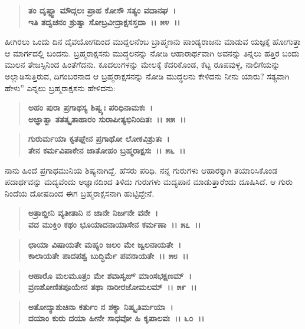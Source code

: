 \begin{verse}
\textbf{ತಂ ದೃಷ್ಟ್ವಾ ಮೌದ್ಗಲಃ ಪ್ರಾಹ ಕೋಸೌ ಸತ್ಯಂ ವದಾನಘ~।}\\\textbf{ಇತಿ ತದ್ವಚನಂ ಶ್ರುತ್ವಾ ಸೋಬ್ರವೀದ್ರಾಕ್ಷಸಸ್ತದಾ~।। ೫೪~।।}
\end{verse}

ಹೀಗಿರಲು ಒಂದು ದಿನ ದೈವಯೋಗದಿಂದ ಮುದ್ದಲನೆಂಬ ಬ್ರಾಹ್ಮಣನು ಪಾಂಡ್ಯರಾಜನು ಮಾಡುವ ಯಜ್ಞಕ್ಕೆ ಹೋಗುತ್ತಾ ಆ ಮಾರ್ಗದಲ್ಲಿ ಬಂದನು. ಬ್ರಹ್ಮರಾಕ್ಷಸನು ಮುದ್ಧಲನನ್ನು ನೋಡಿ ಆಹಾರಾರ್ಥವಾಗಿ ಅವನನ್ನು ತಿನ್ನಲು ಹತ್ತಿರ ಬಂದು ಮುಲನ ತೇಜಸ್ಸಿನಿಂದ ಹಿಂತೆಗೆದನು. ಕೂದಲುಗಳನ್ನು ಮೇಲಕ್ಕೆ ಕೆದರಿಕೊಂಡ, ಕೆಟ್ಟ ರೂಪವುಳ್ಳ, ನಾಲಿಗೆಯನ್ನು ಅಲ್ಲಾಡಿಸುತ್ತಿರುವ, ದಿಗಂಬರನಾದ ಆ ಬ್ರಹ್ಮರಾಕ್ಷಸನನ್ನು ನೋಡಿ ಮುದ್ಧಲನು ಕೇಳಿದನು ನೀನು ಯಾರು? ಸತ್ಯವಾಗಿ ಹೇಳು” ಎನ್ನಲು ಬ್ರಹ್ಮರಾಕ್ಷಸನು ಹೇಳಿದನು:

\begin{verse}
\textbf{ಅಹಂ ಪುರಾ ಪ್ರಗಾಥಸ್ಯ ಶಿಷ್ವ್ಯಃ ಪರಿಧಿನಾಮಕಃ~।}\\\textbf{ಅಜ್ಞಾತ್ವಾ ತತತ್ಕೃತಾಹಾರಂ ಸುರಾಪೀತ್ಯಭಿನಿಂದಿತಃ~।। ೫೫~।। }
\end{verse}

\begin{verse}
\textbf{ಗುರುರ್ಮಯಾ ಕೃತಘ್ನೇನ ಪ್ರಗಾಥೋ ಲೋಕವಿಶ್ರುತಃ~।}\\\textbf{ತೇನ ಕರ್ಮವಿಪಾಕೇನ ಜಾತೋಹಂ ಬ್ರಹ್ಮರಾಕ್ಷಸಃ~।। ೫೬~।।}
\end{verse}

ನಾನು ಹಿಂದೆ ಪ್ರಗಾಥಮುನಿಯ ಶಿಷ್ಯನಾಗಿದ್ದೆ. ಹೆಸರು ಪರಿಧಿ. ನನ್ನ ಗುರುಗಳು ಆಹಾರಕ್ಕಾಗಿ ತಯಾರಿಸಿಕೊಂಡ ಪದಾರ್ಥವನ್ನು ಮದ್ಯವೆಂದು ಅಜ್ಞಾನದಿಂದ ತಿಳಿದು ಗುರುಗಳು ಮದ್ಯಪಾನ ಮಾಡುತ್ತಾರೆಂದು ದೂಷಿಸಿದೆ. ಆ ಗುರು ನಿಂದೆಯ ದೋಷದಿಂದ ಈಗ ಬ್ರಹ್ಮರಾಕ್ಷಸನಾಗಿ ಹುಟ್ಟಿದ್ದೇನೆ.

\begin{verse}
\textbf{ಅತ್ರಾಬ್ದೀನಿ ವ್ಯತೀತಾನಿ ನ ಜಾನೇ ನಿರ್ಜನೇ ವನೇ~।}\\\textbf{ವದ ಮುಕ್ತಿಂ ಕಥಂ ಭೂಯಾದನಾಯಾಸೇನ ಕರ್ಮಣಾ~।। ೫೭~।।} 
\end{verse}

\begin{verse}
\textbf{ಛಾಯಾ ವಿಷಾಯತೇ ಮಹ್ಯಂ ಜಲಂ ಮೇ ಜ್ವಲನಾಯತೇ~।}\\\textbf{ಕಾಲಾಯತೇ ಪಾದಪಶ್ವ ಬುದ್ಧಿರ್ಮೆ ಪವನಾಯತೇ~।। ೫೮~।। }
\end{verse}

\begin{verse}
\textbf{ಆಹಾರೊ ಮಲಮೂತ್ರಂ ಮೇ ಶವಾಸೃಙ್ ಮಾಂಸಭಕ್ಷಣಮ್~।}\\\textbf{ವ್ರಣಶೋಣಿತಪೂಯೇನ ತಥಾ ನಾರೀರಜೋಮಲಮ್~।। ೫೯~।। }
\end{verse}

\begin{verse}
\textbf{ಅತೋದ್ಯಾಶುಚಿನಾ ಕರ್ತುಂ ನ ಶಕ್ಯಾ ನಿಷ್ಕೃತಿರ್ಮಯಾ~।}\\\textbf{ದಯಾಂ ಕುರು ದಯಾ ಹೀನೇ ಸಾಧವೋ ಹಿ ಕೃಪಾಲವಃ~।। ೬೦~।।}
\end{verse}

